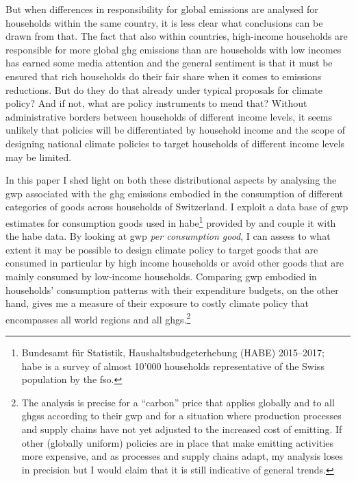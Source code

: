 \documentclass[a4paper,11pt,abstract=true]{scrartcl}
\begin{document}
But when differences in responsibility for global emissions are analysed for households within the same country, it is less clear what conclusions can be drawn from that.
The fact that also within countries, high-income households are responsible for more global \ac{ghg} emissions than are households with low incomes has earned some media attention and the general sentiment is that it must be ensured that rich households do their fair share when it comes to emissions reductions.
But do they do that already under typical proposals for climate policy?
And if not, what are policy instruments to mend that?
Without administrative borders between households of different income levels, it seems unlikely that policies will be differentiated by household income and the scope of designing national climate policies to target households of different income levels may be limited.



In this paper I shed light on both these distributional aspects by analysing the \ac{gwp} associated with the \ac{ghg} emissions embodied in the consumption of different categories of goods across households of Switzerland.
I exploit a data base of \ac{gwp} estimates for consumption goods used in \ac{habe}\footnote{%
  Bundesamt für Statistik, Haushaltsbudgeterhebung (HABE) 2015--2017;\\
  \ac{habe} is a survey of almost 10'000 households representative of the Swiss population by the \ac{fso}.
}
provided by \citet{jakobs_nfp73_2023} and couple it with the \ac{habe} data.
By looking at \ac{gwp} \emph{per consumption good}, I can assess to what extent it may be possible to design climate policy to target goods that are consumed in particular by high income households or avoid other goods that are mainly consumed by low-income households.
Comparing \ac{gwp} embodied in households' consumption patterns with their expenditure budgets, on the other hand, gives me a measure of their exposure to costly climate policy that encompasses all world regions and all \acp{ghg}.\footnote{%
  The analysis is precise for a ``carbon'' price that applies globally and to all \acp{ghg}s according to their \ac{gwp} and for a situation where production processes and supply chains have not yet adjusted to the increased cost of emitting.
  If other (globally uniform) policies are in place that make emitting activities more expensive, and as processes and supply chains adapt, my analysis loses in precision but I would claim that it is still indicative of general trends.
}
\end{document}

